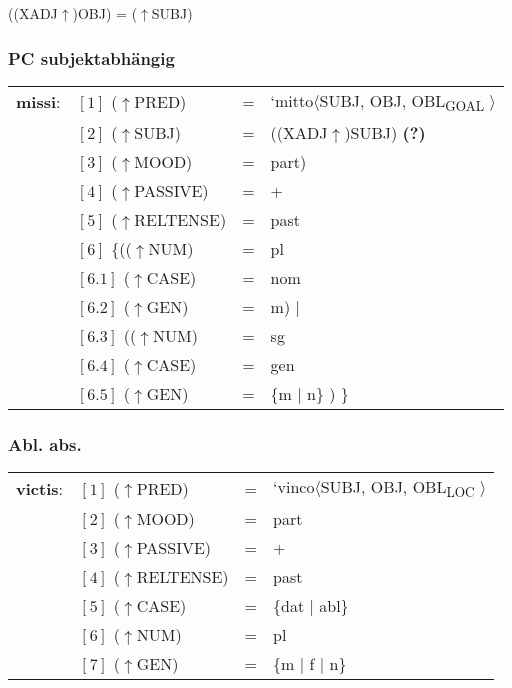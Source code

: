 \documentclass[12pt,a4paper]{article}
\begin{document}
((XADJ$\uparrow$)OBJ) = ($\uparrow$SUBJ) \\

\subsubsection{PC subjektabhängig}

\begin{tabular}{ l  l  l  l  } 
\textbf{missi}: & $[1]$ \:  ($\uparrow$PRED) & = & `mitto$\langle$SUBJ, OBJ, OBL\textsubscript{GOAL} $\rangle$\\
$\qquad$ & $[2]$ \:  ($\uparrow$SUBJ) & = & ((XADJ$\uparrow$)SUBJ) \textbf{(?)}\\
$\qquad$ & $[3]$ \:  ($\uparrow$MOOD) & = & part)\\
$\qquad$ & $[4]$ \:  ($\uparrow$PASSIVE) & = & + \\
$\qquad$ & $[5]$ \: ($\uparrow$RELTENSE) & = & past \\
$\qquad$ & $[6]$ \:  \{(($\uparrow$NUM) & = & pl \\ 
$\qquad$ & $[6.1]$ \:  ($\uparrow$CASE) & = & nom \\
$\qquad$ & $[6.2]$ \:  ($\uparrow$GEN) & = & m) $\mid$\\
$\qquad$ & $[6.3]$ \:  (($\uparrow$NUM) & = & sg \\ 
$\qquad$ & $[6.4]$ \: ($\uparrow$CASE) & = & gen \\
$\qquad$ & $[6.5]$ \:  ($\uparrow$GEN) & = & \{m $\mid$ n\} ) \} \\
\end{tabular}

\subsubsection{Abl. abs.}

\begin{tabular}{ l  l  l  l  } 
\textbf{victis}: & $[1]$ \:  ($\uparrow$PRED) & = & `vinco$\langle$SUBJ, OBJ, OBL\textsubscript{LOC} $\rangle$\\
$\qquad$ & $[2]$ \:  ($\uparrow$MOOD) & = & part\\
$\qquad$ & $[3]$ \: ($\uparrow$PASSIVE) & = & + \\
$\qquad$ & $[4]$ \: ($\uparrow$RELTENSE) & = & past \\
$\qquad$ & $[5]$ \: ($\uparrow$CASE) & = & \{dat $\mid$ abl\} \\
$\qquad$ & $[6]$ \:  ($\uparrow$NUM) & = & pl \\
$\qquad$ & $[7]$ \: ($\uparrow$GEN) & = & \{m $\mid$ f $\mid$ n\} \\
\end{tabular}
\end{document}

